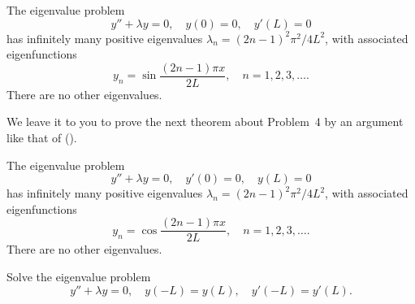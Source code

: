 \begin{theorem}\label{thmtype:11.1.4}
The eigenvalue problem
\[
y''+\lambda y=0,\quad y(0)=0,\quad y'(L)=0
\]
has infinitely many positive eigenvalues
$\lambda_n=(2n-1)^2\pi^2/4L^2$, with associated eigenfunctions
\[
y_n=\sin\frac{(2n-1)\pi x}{2L},\quad n=1,2,3,\dots.
\]
There are no other eigenvalues.
\end{theorem}

We leave it to you to prove the next theorem about Problem~4 by
an argument like that of 
().


\begin{theorem}\label{thmtype:11.1.5}
The eigenvalue problem
\[
y''+\lambda y=0,\quad y'(0)=0,\quad y(L)=0
\]
has infinitely many positive eigenvalues
$\lambda_n=(2n-1)^2\pi^2/4L^2$, with associated eigenfunctions
\[
y_n=\cos\frac{(2n-1)\pi x}{2L},\quad n=1,2,3,\dots.
\]
There are no other eigenvalues.
\end{theorem}

\begin{example}[Problem 5]\label{example:11.1.3}
Solve the eigenvalue  problem
\begin{equation} \label{eq:11.1.5}
y''+\lambda y=0,\quad y(-L)=y(L),\quad y'(-L)=y'(L).
\end{equation}
\end{example}

